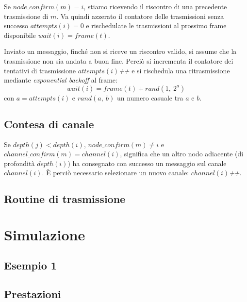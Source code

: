 \documentclass[a4paper,12pt]{article}
\theoremstyle{definition}
\begin{document}
Se $node\_confirm(m) = i$, stiamo ricevendo il riscontro di una precedente trasmissione di $m$. Va quindi azzerato il contatore delle trasmissioni senza successo $attempts(i) = 0$ e rischedulate le trasmissioni al prossimo frame disponibile $wait(i) = frame(t)$.

Inviato un messaggio, finché non si riceve un riscontro valido, si assume che la trasmissione non sia andata a buon fine. Perciò si incrementa il contatore dei tentativi di trasmissione $attempts(i)$\textit{++} e si rischedula una ritrasmissione mediante \emph{exponential backoff} al frame:
\begin{equation*}
wait(i) = frame(t) + rand(1,\ 2^a)
\end{equation*}
con $a = attempts(i)$ e $rand(a,\ b)$ un numero casuale tra $a$ e $b$.

\subsection{Contesa di canale}

Se $depth(j) < depth(i)$, $node\_confirm(m) \neq i$ e $channel\_confirm(m) = channel(i)$, significa che un altro nodo adiacente (di profondità $depth(i)$) ha consegnato con successo un messaggio sul canale $channel(i)$. È perciò necessario selezionare un nuovo canale: $channel(i)$\textit{++}.

\subsection{Routine di trasmissione}


\section{Simulazione}


\subsection{Esempio 1}

\subsection{Prestazioni}
\end{document}
